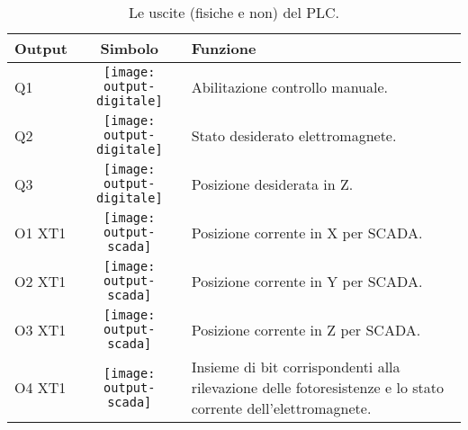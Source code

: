 \begin{table}[htbp]\centering
    \caption{Le uscite (fisiche e non) del PLC.}
    \begin{tabularx}{\columnwidth}{@{}lcX@{}}\toprule
        \textbf{Output} & \textbf{Simbolo}                              & \textbf{Funzione}                                                                                            \\ \midrule
        Q1              & \texttt{[image: output-digitale]} & Abilitazione controllo manuale.                                                                              \\
        Q2              & \texttt{[image: output-digitale]} & Stato desiderato elettromagnete.                                                                             \\
        Q3              & \texttt{[image: output-digitale]} & Posizione desiderata in Z.                                                                                   \\
        O1 XT1          & \texttt{[image: output-scada]}    & Posizione corrente in X per SCADA.                                                                           \\
        O2 XT1          & \texttt{[image: output-scada]}    & Posizione corrente in Y per SCADA.                                                                           \\
        O3 XT1          & \texttt{[image: output-scada]}    & Posizione corrente in Z per SCADA.                                                                           \\
        O4 XT1          & \texttt{[image: output-scada]}    & Insieme di bit corrispondenti alla rilevazione delle fotoresistenze e lo stato corrente dell'elettromagnete. \\
    \bottomrule\end{tabularx}
\end{table}

